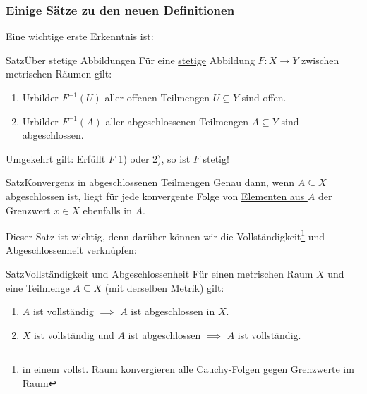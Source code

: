 \subsubsection{Einige Sätze zu den neuen Definitionen}
Eine wichtige erste Erkenntnis ist:
\begin{Satz}
{Satz}{Über stetige Abbildungen}
Für eine \underline{stetige} Abbildung $F:X\to Y$ zwischen metrischen Räumen gilt:
\begin{enumerate}
    \item Urbilder $F^{-1}(U)$ aller offenen Teilmengen $U\subseteq Y$ sind offen.
    \item Urbilder $F^{-1}(A)$ aller abgeschlossenen Teilmengen $A\subseteq Y$ sind abgeschlossen.
\end{enumerate}
Umgekehrt gilt: Erfüllt $F$ 1) oder 2), so ist $F$ stetig!
\end{Satz}
\begin{Satz}
{Satz}{Konvergenz in abgeschlossenen Teilmengen}
Genau dann, wenn $A\subseteq X$ abgeschlossen ist, liegt für jede konvergente Folge von \underline{Elementen aus $A$} der Grenzwert $x\in X$ ebenfalls in $A$.
\end{Satz}
Dieser Satz ist wichtig, denn darüber können wir die Vollständigkeit\footnote{in einem vollst. Raum konvergieren alle Cauchy-Folgen gegen Grenzwerte im Raum} und Abgeschlossenheit verknüpfen:
\begin{Satz}
{Satz}{Vollständigkeit und Abgeschlossenheit}
Für einen metrischen Raum $X$ und eine Teilmenge $A\subseteq X$ (mit derselben Metrik) gilt:
\begin{enumerate}
    \item $A$ ist vollständig $\implies$ $A$ ist abgeschlossen in $X$.
    \item $X$ ist vollständig und $A$ ist abgeschlossen $\implies$ $A$ ist vollständig.
\end{enumerate}
\end{Satz}

